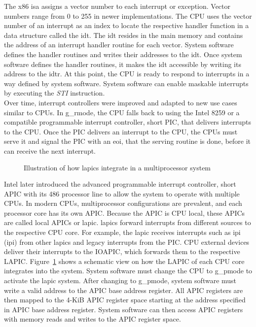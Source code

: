 The x86 \gls{isa} assigns a vector number to each interrupt or exception. Vector
numbers range from 0 to 255 in newer implementations. The CPU uses the vector
number of an interrupt as an index to locate the respective handler function in
a data structure called the \gls{idt}. The \gls{idt} resides in the main memory
and contains the address of an interrupt handler routine for each vector. System
software defines the handler routines and writes their addresses to the
\gls{idt}. Once system software defines the handler routines, it makes the
\gls{idt} accessible by writing its address to the \gls{idtr}. At this point,
the CPU is ready to respond to interrupts in a way defined by system software.
System software can enable maskable interrupts by executing the \textit{STI}
instruction.\\

Over time, interrupt controllers were improved and adapted to new use cases
similar to CPUs. In \gls{g_rmode}, the CPU falls back to using the Intel 8259 or a
compatible programmable interrupt controller, short PIC, that delivers
interrupts to the CPU. Once the PIC delivers an interrupt to the CPU, the CPUs
must serve it and signal the PIC with an \gls{eoi}, that
the serving routine is done, before it can receive the next interrupt. \\

\begin{figure}
    \begin{center}
        
        \caption{Illustration of how \glspl{lapic} integrate in a
            multiprocessor system}
        \label{fig:state:technical:lapic}
    \end{center}
\end{figure}

Intel later introduced the advanced programmable interrupt controller, short
APIC with its 486 processor line to allow the system to operate with multiple
CPUs. In modern CPUs, multiprocessor configurations are prevalent, and each
processor core has its own APIC. Because the APIC is CPU local, these APICs are
called local APICs or \gls{lapic}. \glspl{lapic}
forward interrupts from different sources to the respective CPU core. For
example, the \gls{lapic} receives interrupts such as \gls{ipi}
(\gls{ipi}) from other \glspl{lapic} and legacy interrupts from the
PIC. CPU external devices deliver their interrupts to the IOAPIC, which
forwards them to the respective LAPIC. Figure~\ref{fig:state:technical:lapic}
shows a schematic view on how the LAPIC of each CPU core integrates into the
system. System software must change the CPU to \gls{g_pmode} to activate the
\gls{lapic} system. After changing to \gls{g_pmode}, system software must
write a valid address to the APIC base address register. All APIC registers are
then mapped to the 4-KiB APIC register space starting at the address specified
in APIC base address register. System software can then access APIC registers
with memory reads and writes to the APIC register space.

